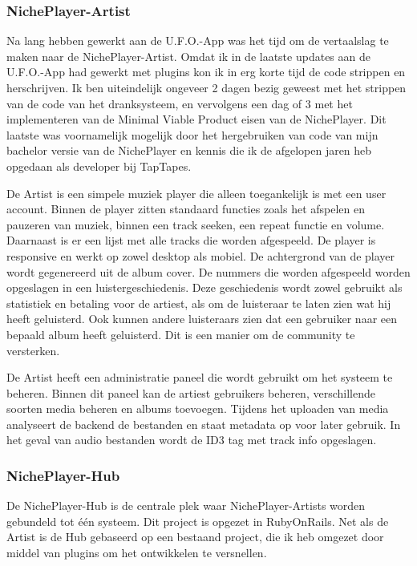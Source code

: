 \subsubsection*{NichePlayer-Artist}
Na lang hebben gewerkt aan de U.F.O.-App was het tijd om de vertaalslag te maken naar de NichePlayer-Artist. Omdat ik in de laatste updates aan de U.F.O.-App had gewerkt met plugins kon ik in erg korte tijd de code strippen en herschrijven. Ik ben uiteindelijk ongeveer 2 dagen bezig geweest met het strippen van de code van het dranksysteem, en vervolgens een dag of 3 met het implementeren van de Minimal Viable Product eisen van de NichePlayer. Dit laatste was voornamelijk mogelijk door het hergebruiken van code van mijn bachelor versie van de NichePlayer en kennis die ik de afgelopen jaren heb opgedaan als developer bij TapTapes.

De Artist is een simpele muziek player die alleen toegankelijk is met een user account. Binnen de player zitten standaard functies zoals het afspelen en pauzeren van muziek, binnen een track seeken, een repeat functie en volume. Daarnaast is er een lijst met alle tracks die worden afgespeeld. De player is responsive en werkt op zowel desktop als mobiel. De achtergrond van de player wordt gegenereerd uit de album cover. De nummers die worden afgespeeld worden opgeslagen in een luistergeschiedenis. Deze geschiedenis wordt zowel gebruikt als statistiek en betaling voor de artiest, als om de luisteraar te laten zien wat hij heeft geluisterd. Ook kunnen andere luisteraars zien dat een gebruiker naar een bepaald album heeft geluisterd. Dit is een manier om de community te versterken.

De Artist heeft een administratie paneel die wordt gebruikt om het systeem te beheren. Binnen dit paneel kan de artiest gebruikers beheren, verschillende soorten media beheren en albums toevoegen. Tijdens het uploaden van media analyseert de backend de bestanden en staat metadata op voor later gebruik. In het geval van audio bestanden wordt de ID3 tag met track info opgeslagen.

\subsubsection*{NichePlayer-Hub}
De NichePlayer-Hub is de centrale plek waar NichePlayer-Artists worden gebundeld tot één systeem. Dit project is opgezet in RubyOnRails. Net als de Artist is de Hub gebaseerd op een bestaand project, die ik heb omgezet door middel van plugins om het ontwikkelen te versnellen.

